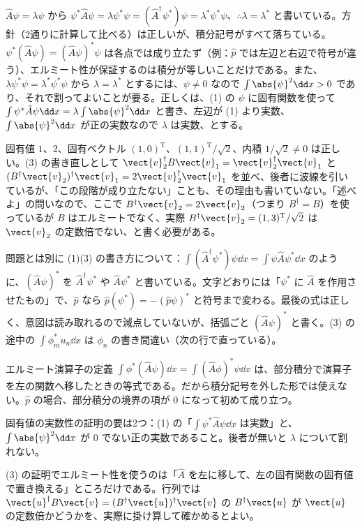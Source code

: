 \begin{kotaeran}
   $\hat{A}\psi=\lambda\psi$ から $\psi^{*}\hat{A}\psi=\lambda\psi^{*}\psi=(\hat{A}^{\dagger}\psi^{*})\psi=\lambda^{*}\psi^{*}\psi$、$\therefore\lambda=\lambda^{*}$ と書いている。方針（2通りに計算して比べる）は正しいが、積分記号がすべて落ちている。$\psi^{*}(\hat{A}\psi)=(\hat{A}\psi)^{*}\psi$ は各点では成り立たず（例：$\hat{p}$ では左辺と右辺で符号が違う）、エルミート性が保証するのは積分が等しいことだけである。また、$\lambda\psi^{*}\psi=\lambda^{*}\psi^{*}\psi$ から $\lambda=\lambda^{*}$ とするには、$\psi\neq0$ なので $\int\abs{\psi}^{2}\dd x>0$ であり、それで割ってよいことが要る。正しくは、(1) の $\psi$ に固有関数を使って $\int\psi^{*}\hat{A}\psi\dd x=\lambda\int\abs{\psi}^{2}\dd x$ と書き、左辺が (1) より実数、$\int\abs{\psi}^{2}\dd x$ が正の実数なので $\lambda$ は実数、とする。

   固有値 $1$、$2$、固有ベクトル $(1,0)^{\mathrm{T}}$、$(1,1)^{\mathrm{T}}/\sqrt{2}$、内積 $1/\sqrt{2}\neq0$ は正しい。(3) の書き直しとして $\vect{v}_{2}^{\dagger}B\vect{v}_{1}=\vect{v}_{2}^{\dagger}\vect{v}_{1}$ と $(B^{\dagger}\vect{v}_{2})^{\dagger}\vect{v}_{1}=2\vect{v}_{2}^{\dagger}\vect{v}_{1}$ を並べ、後者に波線を引いているが、「この段階が成り立たない」ことも、その理由も書いていない。「述べよ」の問いなので、ここで $B^{\dagger}\vect{v}_{2}=2\vect{v}_{2}$（つまり $B^{\dagger}=B$）を使っているが $B$ はエルミートでなく、実際 $B^{\dagger}\vect{v}_{2}=(1,3)^{\mathrm{T}}/\sqrt{2}$ は $\vect{v}_{2}$ の定数倍でない、と書く必要がある。

  問題とは別に (1)(3) の書き方について：$\int(\hat{A}^{\dagger}\psi^{*})\psi\dd x=\int\psi\hat{A}\psi^{*}\dd x$ のように、$(\hat{A}\psi)^{*}$ を $\hat{A}^{\dagger}\psi^{*}$ や $\hat{A}\psi^{*}$ と書いている。文字どおりには「$\psi^{*}$ に $\hat{A}$ を作用させたもの」で、$\hat{p}$ なら $\hat{p}(\psi^{*})=-(\hat{p}\psi)^{*}$ と符号まで変わる。最後の式は正しく、意図は読み取れるので減点していないが、括弧ごと $(\hat{A}\psi)^{*}$ と書く。(3) の途中の $\int\phi_{m}^{*}u_{n}\dd x$ は $\phi_{n}$ の書き間違い（次の行で直っている）。
\end{kotaeran}
\begin{rikai}
  \item エルミート演算子の定義 $\int\phi^{*}(\hat{A}\psi)\dd x=\int(\hat{A}\phi)^{*}\psi\dd x$ は、部分積分で演算子を左の関数へ移したときの等式である。だから積分記号を外した形では使えない。$\hat{p}$ の場合、部分積分の境界の項が 0 になって初めて成り立つ。
  \item 固有値の実数性の証明の要は2つ：(1) の「$\int\psi^{*}\hat{A}\psi\dd x$ は実数」と、$\int\abs{\psi}^{2}\dd x$ が 0 でない正の実数であること。後者が無いと $\lambda$ について割れない。
  \item (3) の証明でエルミート性を使うのは「$\hat{A}$ を左に移して、左の固有関数の固有値で置き換える」ところだけである。行列では $\vect{u}^{\dagger}B\vect{v}=(B^{\dagger}\vect{u})^{\dagger}\vect{v}$ の $B^{\dagger}\vect{u}$ が $\vect{u}$ の定数倍かどうかを、実際に掛け算して確かめるとよい。
\end{rikai}
